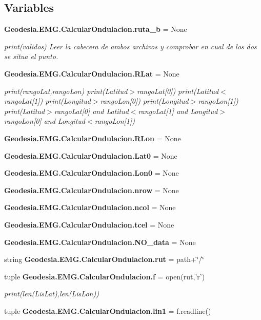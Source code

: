 \subsection*{Variables}
\begin{DoxyCompactItemize}
\item 
{\bf Geodesia.\-E\-M\-G.\-Calcular\-Ondulacion.\-ruta\-\_\-b} = None
\begin{DoxyCompactList}\small\item\em print(validos) Leer la cabecera de ambos archivos y comprobar en cual de los dos se situa el punto. \end{DoxyCompactList}\item 
{\bf Geodesia.\-E\-M\-G.\-Calcular\-Ondulacion.\-R\-Lat} = None
\begin{DoxyCompactList}\small\item\em print(rango\-Lat,rango\-Lon) print(\-Latitud$>$rango\-Lat[0]) print(\-Latitud$<$rango\-Lat[1]) print(\-Longitud$>$rango\-Lon[0]) print(\-Longitud$>$rango\-Lon[1]) print(\-Latitud$>$rango\-Lat[0] and Latitud$<$rango\-Lat[1] and Longitud$>$rango\-Lon[0] and Longitud$<$rango\-Lon[1]) \end{DoxyCompactList}\item 
{\bf Geodesia.\-E\-M\-G.\-Calcular\-Ondulacion.\-R\-Lon} = None
\item 
{\bf Geodesia.\-E\-M\-G.\-Calcular\-Ondulacion.\-Lat0} = None
\item 
{\bf Geodesia.\-E\-M\-G.\-Calcular\-Ondulacion.\-Lon0} = None
\item 
{\bf Geodesia.\-E\-M\-G.\-Calcular\-Ondulacion.\-nrow} = None
\item 
{\bf Geodesia.\-E\-M\-G.\-Calcular\-Ondulacion.\-ncol} = None
\item 
{\bf Geodesia.\-E\-M\-G.\-Calcular\-Ondulacion.\-tcel} = None
\item 
{\bf Geodesia.\-E\-M\-G.\-Calcular\-Ondulacion.\-N\-O\-\_\-data} = None
\item 
string {\bf Geodesia.\-E\-M\-G.\-Calcular\-Ondulacion.\-rut} = path+\char`\"{}/\char`\"{}
\item 
tuple {\bf Geodesia.\-E\-M\-G.\-Calcular\-Ondulacion.\-f} = open(rut,'r')
\begin{DoxyCompactList}\small\item\em print(len(\-Lis\-Lat),len(\-Lis\-Lon)) \end{DoxyCompactList}\item 
tuple {\bf Geodesia.\-E\-M\-G.\-Calcular\-Ondulacion.\-lin1} = f.\-readline()
\item 

\end{DoxyCompactItemize}

